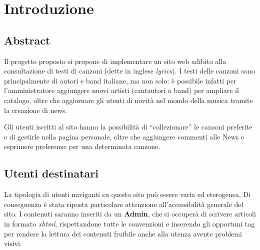 \section{Introduzione}

\subsection{Abstract}
Il progetto proposto si propone di implementare un sito web adibito alla consultazione di testi di canzoni (dette in inglese \textit{lyrics}).
I testi delle canzoni sono principalmente di autori e band italiane, ma non solo: \`e possibile infatti per l'amministratore aggiungere nuovi artisti (cantautori o band) per ampliare il catalogo, oltre che aggiornare gli utenti di novit\`a nel mondo della musica tramite la creazione di news.

Gli utenti iscritti al sito hanno la possibilit\`a di ``collezionare'' le canzoni preferite e di gestirle nella pagina personale, oltre che aggiungere commenti alle News e esprimere preferenze per una determinata canzone.


\subsection{Utenti destinatari}
La tipologia di utenti naviganti su questo sito pu\`o essere varia ed eterogenea. Di conseguenza \`e stata riposta particolare attenzione all'accessibilit\`a generale del sito. I contenuti saranno inseriti da un \textbf{Admin}, che si occuper\`a di scrivere articoli in formato \textit{xhtml}, rispettandone tutte le convenzioni e inserendo gli opportuni tag per rendere la lettura dei contenuti fruibile anche alla utenza avente problemi visivi.
